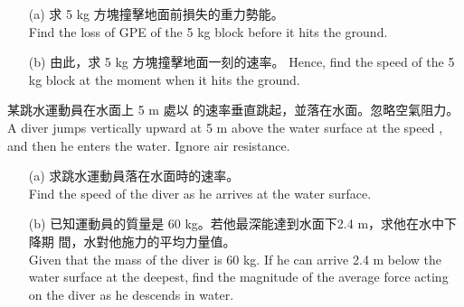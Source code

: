\documentclass[beamer=true]{standalone}
\begin{document}
\begin{eg}
    \begin{itemize}
        \item[(a)] 求 5 kg 方塊撞擊地面前損失的重力勢能。 \\Find the loss of GPE of the 5 kg block before it hits the ground.
    \end{itemize}
\end{eg}

\begin{eg}
    \begin{itemize}
        \item [(b)] 由此，求 5 kg 方塊撞擊地面一刻的速率。 Hence, find the speed of the 5 kg block at the moment when it hits the ground.
    \end{itemize}
\end{eg}

\begin{eg}
    某跳水運動員在水面上 5 m 處以  的速率垂直跳起，並落在水面。忽略空氣阻力。 \\A diver jumps vertically upward at 5 m above the water surface at the speed , and then he enters the water. Ignore air resistance.
    \begin{itemize}
        \item [(a)] 求跳水運動員落在水面時的速率。 \\Find the speed of the diver as he arrives at the water surface.
    \end{itemize}
\end{eg}

\begin{eg}
    \begin{itemize}
        \item [(b)] 已知運動員的質量是 60 kg。若他最深能達到水面下2.4 m，求他在水中下降期 間，水對他施力的平均力量值。 \\Given that the mass of the diver is 60 kg. If he can arrive 2.4 m below the water surface at the deepest, find the magnitude of the average force acting on the diver as he descends in water.
    \end{itemize}
\end{eg}
\end{document}
